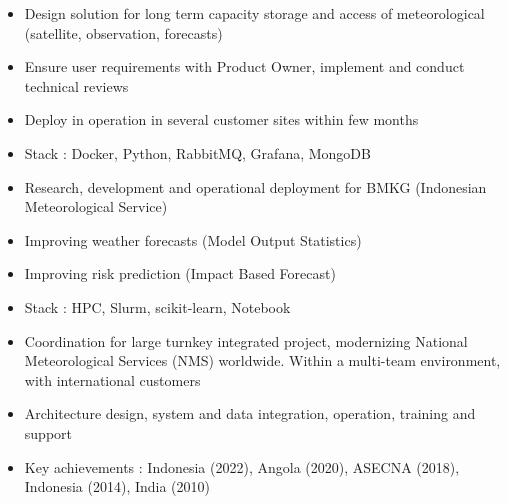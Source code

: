 \documentclass[10pt,a4paper,ragged2e,withhyper]{altacv}
\begin{document}
\begin{paracol}{2}


\divider


\begin{itemize}
\item Design solution for long term capacity storage and access of meteorological (satellite, observation, forecasts)
\item Ensure user requirements with Product Owner, implement and conduct technical reviews
\item Deploy in operation in several customer sites within few months
\item Stack : Docker, Python, RabbitMQ, Grafana, MongoDB
\end{itemize}

\divider

\begin{itemize}
\item Research, development and operational deployment for BMKG (Indonesian Meteorological Service)
\item Improving weather forecasts (Model Output Statistics)
\item Improving risk prediction (Impact Based Forecast)
\item Stack : HPC, Slurm, scikit-learn, Notebook
\end{itemize}

\divider

\begin{itemize}
\item Coordination for large turnkey integrated project, modernizing National Meteorological Services (NMS) worldwide. Within a multi-team environment, with international customers
\item Architecture design, system and data integration, operation, training and support
\item Key achievements : Indonesia (2022), Angola (2020), ASECNA (2018), Indonesia (2014), India (2010)
\end{itemize}

\divider


\end{paracol}
\end{document}
